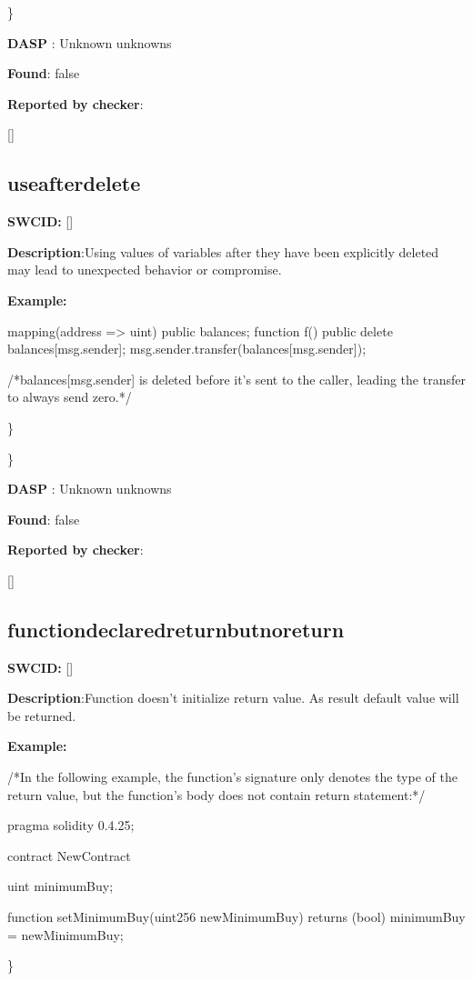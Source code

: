 \documentclass{article}
\begin{document}
\} 

\textbf{DASP} : Unknown unknowns

\textbf{Found}: false

\textbf{Reported by checker}: 
\begin{ffcode} 

[]
\end{ffcode} 
\subsection{use{\textunderscore}after{\textunderscore}delete} 
\textbf{SWC{\textunderscore}ID:} []

\textbf{Description}:Using values of variables after they have been explicitly deleted may lead to unexpected behavior or compromise.


\textbf{Example:} 
\begin{ffcode} 

mapping(address => uint) public balances;
function f() public {
    delete balances[msg.sender];
    msg.sender.transfer(balances[msg.sender]);
}

 /*balances[msg.sender] is deleted before it's sent to the caller, leading the transfer to always send zero.*/ 

\end{ffcode} 
\} 

\} 

\textbf{DASP} : Unknown unknowns

\textbf{Found}: false

\textbf{Reported by checker}: 
\begin{ffcode} 

[]
\end{ffcode} 
\subsection{function{\textunderscore}declared{\textunderscore}return{\textunderscore}but{\textunderscore}no{\textunderscore}return} 
\textbf{SWC{\textunderscore}ID:} []

\textbf{Description}:Function doesn't initialize return value. As result default value will be returned.


\textbf{Example:} 
\begin{ffcode} 

/*In the following example, the function's signature only denotes the type of the return value, but the function's body does not contain return statement:*/ 

pragma solidity 0.4.25;

contract NewContract {
    uint minimumBuy;

    function setMinimumBuy(uint256 newMinimumBuy) returns (bool){
        minimumBuy = newMinimumBuy;
    }
}

\end{ffcode} 
\} 
\end{document}
